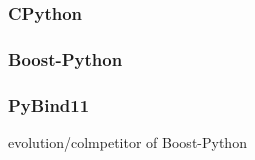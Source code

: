 
\subsubsection{CPython}

\subsubsection{Boost-Python}

\subsubsection{PyBind11}

evolution/colmpetitor of Boost-Python

